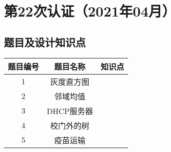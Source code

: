 \documentclass[cn,10pt,math=newtx,citestyle=gb7714-2015,bibstyle=gb7714-2015]{elegantbook}
\begin{document}


% 

% 

% 

% 

% 



% 

% 

% 

% 

% 


\chapter{第22次认证（2021年04月）}

\section{题目及设计知识点}

\begin{table}[htbp]
  \centering
  \begin{tabular}{ccc}
    \toprule
    题目编号 & 题目名称   & 知识点 \\
    \midrule
    1        & 灰度直方图 &        \\
    2        & 邻域均值   &        \\
    3        & DHCP服务器 &        \\
    4        & 校门外的树 &        \\
    5        & 疫苗运输   &        \\
    \bottomrule
  \end{tabular}
\end{table}
\end{document}
